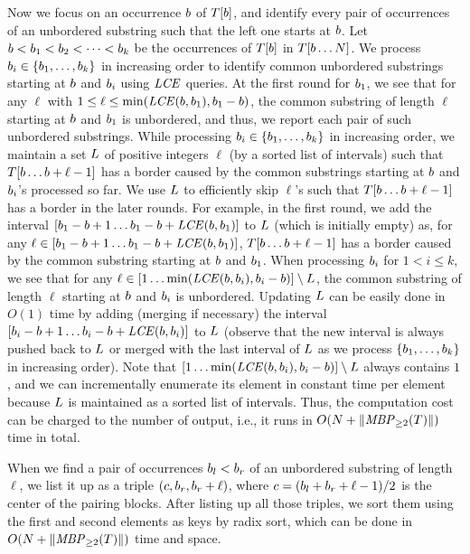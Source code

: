 Now we focus on an occurrence $b$ of $T[b]$,
and identify every pair of occurrences of an unbordered substring such that the left one starts at $b$.
Let $b < b_1 < b_2 < \cdots < b_k$ be the occurrences of $T[b]$ in $T[b \ldots N]$.
We process $b_i \in \{b_1, \ldots, b_k\}$ in increasing order to identify common unbordered substrings
starting at $b$ and $b_i$ using $\mathit{LCE}$ queries.
At the first round for $b_1$, we see that for any $\ell$ with $1 \le \ell \le \min (\mathit{LCE}(b, b_1), b_1 - b)$,
the common substring of length $\ell$ starting at $b$ and $b_1$ is unbordered,
and thus, we report each pair of such unbordered substrings.
While processing $b_i \in \{b_1, \ldots, b_k\}$ in increasing order,
we maintain a set $L$ of positive integers $\ell$ (by a sorted list of intervals) such that $T[b \ldots b + \ell - 1]$ has a border 
caused by the common substrings starting at $b$ and $b_i$'s processed so far.
We use $L$ to efficiently skip $\ell$'s such that $T[b \ldots b + \ell - 1]$ has a border in the later rounds.
For example, in the first round, we add the interval $[b_1 - b + 1 \ldots b_1 - b + \mathit{LCE}(b, b_1)]$ to $L$ (which is initially empty)
as, for any $\ell \in [b_1 - b + 1 \ldots b_1 - b + \mathit{LCE}(b, b_1)]$, $T[b \ldots b + \ell - 1]$ has a border 
caused by the common substring starting at $b$ and $b_1$.
When processing $b_i$ for $1 < i \le k$, we see that for any $\ell \in [1 \ldots \min (\mathit{LCE}(b, b_i), b_i - b)] \setminus L$,
the common substring of length $\ell$ starting at $b$ and $b_i$ is unbordered.
Updating $L$ can be easily done in $O(1)$ time by adding (merging if necessary) the interval $[b_i - b + 1 \ldots b_i - b + \mathit{LCE}(b, b_i)]$
to $L$ (observe that the new interval is always pushed back to $L$ or merged with the last interval of $L$
as we process $\{b_1, \ldots, b_k\}$ in increasing order).
Note that $[1 \ldots \min (\mathit{LCE}(b, b_i), b_i - b)] \setminus L$ always contains $1$,
and we can incrementally enumerate its element in constant time per element
because $L$ is maintained as a sorted list of intervals.
Thus, the computation cost can be charged to the number of output, i.e., it runs in $O(N + \|\mathit{MBP}_{\ge 2}(T)\|)$ time in total.

When we find a pair of occurrences $b_{l} < b_{r}$ of an unbordered substring of length $\ell$,
we list it up as a triple $(c, b_{r}, b_{r} + \ell)$, where $c = (b_{l} + b_{r} + \ell - 1) / 2$ is the center of the pairing blocks.
After listing up all those triples, we sort them using the first and second elements as keys by radix sort,
which can be done in $O(N + \|\mathit{MBP}_{\ge 2}(T)\|)$ time and space.


